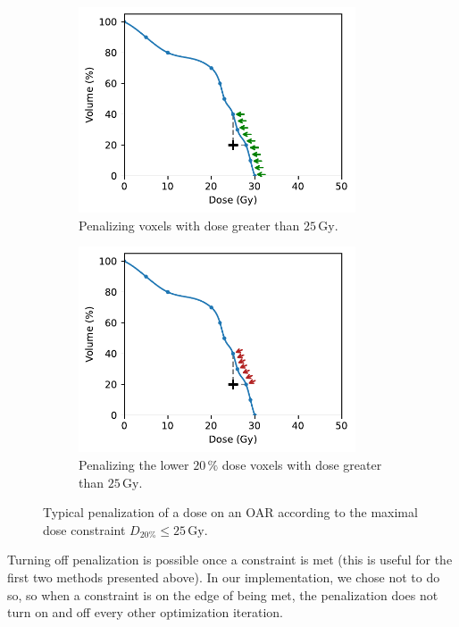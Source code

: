 \begin{figure}
\begin{subfigure}{0.32\textwidth}
		\includegraphics[width=0.9\textwidth]{constraint_penalization_plot_2.pdf}
		\caption{Penalizing voxels with dose greater than $25\,\text{Gy}$.}
		\label{fig:constraint_penalization_plot_2}
	\end{subfigure}
	\begin{subfigure}{0.32\textwidth}
		\centering
		\includegraphics[width=0.9\textwidth]{constraint_penalization_plot_3.pdf}
		\caption{Penalizing the lower $20\,\%$ dose voxels with dose greater than $25\,\text{Gy}$.}
		\label{fig:constraint_penalization_plot_3}
	\end{subfigure}
	\caption{Typical penalization of a dose on an OAR according to the maximal dose constraint $D_{20\%} \leq 25\,\text{Gy}$.}
	\label{fig:constraint_penalization}
\end{figure}

Turning off penalization is possible once a constraint is met (this is useful for the first two methods presented above).
In our implementation, we chose not to do so, so when a constraint is on the edge of being met, the penalization does not turn on and off every other optimization iteration.

